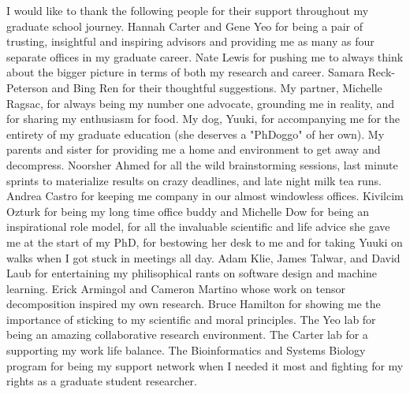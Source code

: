\documentclass[11pt]{formatting-template}
\begin{document}
\begin{acknowledgements}
	I would like to thank the following people for their support throughout my graduate school journey. Hannah Carter and Gene Yeo for being a pair of trusting, insightful and inspiring advisors and providing me as many as four separate offices in my graduate career. Nate Lewis for pushing me to always think about the bigger picture in terms of both my research and career. Samara Reck-Peterson and Bing Ren for their thoughtful suggestions. My partner, Michelle Ragsac, for always being my number one advocate, grounding me in reality, and for sharing my enthusiasm for food. My dog, Yuuki, for accompanying me for the entirety of my graduate education (she deserves a "PhDoggo" of her own). My parents and sister for providing me a home and environment to get away and decompress. Noorsher Ahmed for all the wild brainstorming sessions, last minute sprints to materialize results on crazy deadlines, and late night milk tea runs.  Andrea Castro for keeping me company in our almost windowless offices. Kivilcim Ozturk for being my long time office buddy and Michelle Dow for being an inspirational role model, for all the invaluable scientific and life advice she gave me at the start of my PhD, for bestowing her desk to me and for taking Yuuki on walks when I got stuck in meetings all day. Adam Klie, James Talwar, and David Laub for entertaining my philisophical rants on software design and machine learning. Erick Armingol and Cameron Martino whose work on tensor decomposition inspired my own research. Bruce Hamilton for showing me the importance of sticking to my scientific and moral principles. The Yeo lab for being an amazing collaborative research environment. The Carter lab for a supporting my work life balance. The Bioinformatics and Systems Biology program for being my support network when I needed it most and fighting for my rights as a graduate student researcher. 
\end{acknowledgements}
\end{document}
